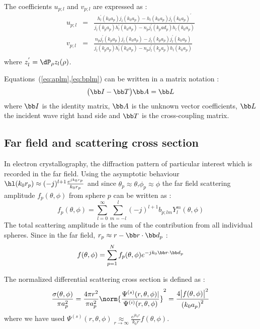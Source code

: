 The coefficients $u_{p;l}$ and $v_{p;l}$ are expressed as :
\begin{eqnarray*}
  u_{p;l} &=& \frac{h_l^{'}(k_0a_p)j_l(k_0a_p) - h_l(k_0a_p)j_l(k_0a_p)^{'}}
    {j_l(k_pa_p)h_l^{'}(k_0a_p)-n_pj_l^{'}(k_pad_p)h_l(k_0a_p)} \\
  v_{p;l} &=& \frac{n_pj_l^{'}(k_pa_p)j_l(k_0a_p) - j_l(k_pa_p)j_l^{'}(k_0a_p)}
    {j_l(k_pa_p)h_l^{'}(k_0a_p)-n_pj_l^{'}(k_pa_p)h_l(k_0a_p)} \\
\end{eqnarray*}
%
where $z_l^{'}=\dP_{\rho}z_l(\rho)$.

Equations~(\ref{eq:aplm},\ref{eq:bplm}) can be written in a matrix notation :
%
\begin{equation}\label{eq:Tsystem}
  \big(\bb I - \bb T \big)\bb A = \bb L
\end{equation}
%
where
$\bb I$ is the identity matrix,
$\bb A$ is the unknown vector coefficients,
$\bb L$ the incident wave right hand side and
$\bb T$ is the cross-coupling matrix.


\subsection{Far field and scattering cross section}
In electron crystallography, the diffraction pattern of particular
interest which is recorded in the far field. Using the asymptotic
behaviour $\hl(k_0r_p)\approx (-j)^{l+1}\frac{e^{jk_0r_p}}{k_0r_p}$
and since $\theta_p\approx\theta$,$\phi_p\approx\phi$
the far field scattering amplitude $f_p(\theta,\phi)$ from sphere $p$ can
be written as :
%
\begin{equation}\label{eq:fp_theta}
  f_p(\theta,\phi) = \sum_{l=0}^{\infty}\sum_{m=-l}^{l} (-j)^{l+1}b_{p;lm}Y_l^m(\theta,\phi)
\end{equation}
%
The total scattering amplitude is the sum of the contribution from all
individual spheres.
Since in the far field, $r_p\approx r-\bb r\cdot\bb d_p$ :
%
\begin{equation}\label{eq:f_theta}
  f(\theta,\phi) = \sum_{p=1}^{N} f_p(\theta,\phi)e^{-jk_0\bb r\cdot\bb d_p}
\end{equation}
%

The normalized differential scattering cross section is defined as :
%
\begin{equation}\label{eq:sigma}
  \frac{\sigma(\theta,\phi)}{\pi a_p^2}
  = \frac{4\pi r^2}{\pi a_p^2}
    \norm{\frac{\Psi^{(s)}(r,\theta,\phi)|}{\Psi^{(i)}(r,\theta,\phi)}}^2
  = \frac{4\bigl|f(\theta,\phi)\bigr|^2}{\left(k_0a_p\right)^2}
\end{equation}
%
where we have used
$\Psi^{(s)}(r,\theta,\phi) \underset{r\rightarrow\infty}\approx \frac{e^{jk_0r}}{k_0r}f(\theta,\phi)$.





